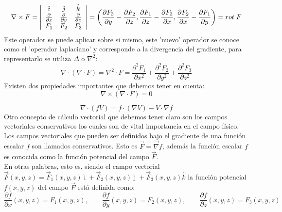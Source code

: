 \documentclass[11pt]{article}
\begin{document}
$$\nabla \times F = \left| {\begin{array}{ccc}
   \hat{\imath} & \hat{\jmath} & \hat{k} \\
   \frac{\partial}{\partial x} & \frac{\partial}{\partial y} & \frac{\partial}{\partial z} \\
   F_1 & F_2 & F_3 \\
  \end{array} } \right|
  =\left(\frac{\partial F_3}{\partial y}-\frac{\partial F_2}{\partial z},\frac{\partial F_1}{\partial z}-\frac{\partial F_3}{\partial x},\frac{\partial F_2}{\partial x}-\frac{\partial F_1}{\partial y}\right) = \mathnormal{rot}\;F$$
Este operador se puede aplicar sobre si mismo, este 'nuevo' operador se conoce como el 'operador laplaciano' y corresponde a la divergencia del gradiente, para representarlo se utiliza $\Delta$ o $\nabla^2$:
$$\nabla \cdot (\nabla \cdot F) =\nabla^2 \cdot F =\frac{\partial^2 F_1}{\partial x^2}+\frac{\partial^2 F_2}{\partial y^2}+\frac{\partial^2 F_3}{\partial z^2}$$
Existen dos propiedades importantes que debemos tener en cuenta:
\begin{equation}
\label{eq:Rotor de una divergencia}
\nabla \times (\nabla \cdot F)=0
\end{equation}

\begin{equation}
\label{eq:Identidad gradiente}
\nabla \cdot (fV)=f\cdot (\nabla V)-V\cdot\nabla f
\end{equation}
Otro concepto de cálculo vectorial que debemos tener claro son los campos vectoriales conservativos los cuales son de vital importancia en el campo físico. 
Los campos vectoriales que pueden ser definidos bajo el gradiente de una función escalar $f$ son llamados conservativos. Esto es $\vec{F}=\vec{\nabla} f$, además la función escalar $f$ es conocida como la función potencial del campo $\vec{F}$.\\
En otras palabras, esto es, siendo el campo vectorial $\vec{F}(x,y,z)=\vec{F}_1(x,y,z)\hat{\imath}+\vec{F}_2(x,y,z)\hat{\jmath}+\vec{F}_3(x,y,z)\hat{k}$ la función potencial $f(x,y,z)$ del campo $\vec{F}$ está definida como:
$$\frac{\partial f}{\partial x}(x,y,z)=F_1(x,y,z),\qquad \frac{\partial f}{\partial y}(x,y,z)=F_2(x,y,z),\qquad \frac{\partial f}{\partial z}(x,y,z)=F_3(x,y,z)$$
\end{document}
